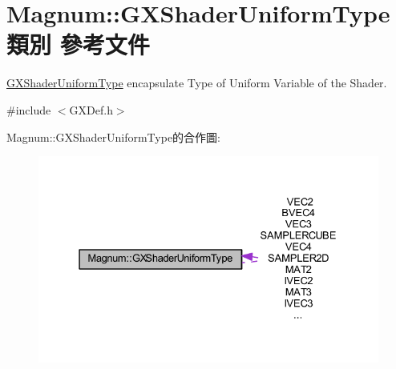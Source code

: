 \hypertarget{class_magnum_1_1_g_x_shader_uniform_type}{}\section{Magnum\+:\+:G\+X\+Shader\+Uniform\+Type 類別 參考文件}
\label{class_magnum_1_1_g_x_shader_uniform_type}


\hyperlink{class_magnum_1_1_g_x_shader_uniform_type}{G\+X\+Shader\+Uniform\+Type} encapsulate Type of Uniform Variable of the Shader.  




{\ttfamily \#include $<$G\+X\+Def.\+h$>$}



Magnum\+:\+:G\+X\+Shader\+Uniform\+Type的合作圖\+:\nopagebreak
\begin{figure}[H]
\begin{center}
\leavevmode
\includegraphics[width=331pt]{class_magnum_1_1_g_x_shader_uniform_type__coll__graph}
\end{center}
\end{figure}

